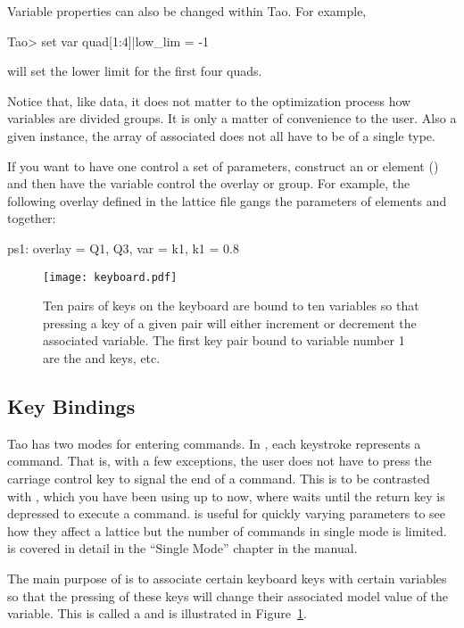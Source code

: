 \documentclass{hitec}     %
\begin{document}
{Variable properties can also be changed within Tao. For example, 
\begin{code}
Tao> set var quad[1:4]|low_lim = -1
\end{code}
will set the lower limit for the first four quads.

Notice that, like data, it does not matter to the optimization process how variables are divided
groups. It is only a matter of convenience to the user. Also a given  instance, the array
of associated  does not all have to be of a single type.

If you want to have one \tao {} control a set of parameters, construct an  or
 element () and then have the \tao variable control the overlay or
group. For example, the following overlay defined in the lattice file gangs the  parameters
of elements  and  together:
\begin{code}
ps1: overlay = {Q1, Q3}, var = {k1}, k1 = 0.8
\end{code}

\begin{figure}[b]
  \centering
  \texttt{[image: keyboard.pdf]}
  \caption
{Ten pairs of keys on the keyboard are bound to ten variables so that pressing a key of a given pair
will either increment or decrement the associated variable. The first key pair bound to variable
number 1 are the  and  keys, etc.}
  \label{f:keyboard}
\end{figure}

\subsection{Key Bindings}
\label{s:key.bound}

Tao has two modes for entering commands. In , each keystroke represents a command.
That is, with a few exceptions, the user does not have to press the carriage control key to signal
the end of a command. This is to be contrasted with , which you have been using up to
now, where \tao waits until the return key is depressed to execute a command.  is
useful for quickly varying parameters to see how they affect a lattice but the number of commands in
single mode is limited.  is covered in detail in the ``Single Mode'' chapter in the
\tao manual.

The main purpose of  is to associate certain keyboard keys with certain variables so that
the pressing of these keys will change their associated model value of the variable. This is called
a  and is illustrated in Figure~\ref{f:keyboard}.

}
\end{document}
